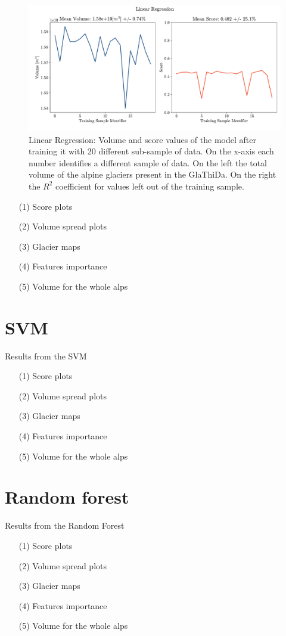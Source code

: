 \begin{figure}[!tp]
	\centering		  
	\includegraphics[width=1.\textwidth]{figures/LR_score.pdf}
	\caption{Linear Regression: Volume and score values of the model after training it with 20 different sub-sample of data. On the x-axis each number identifies a different sample of data. On the left the total volume of the alpine glaciers present in the GlaThiDa. On the right the $R^2$ coefficient for values left out of the training sample.}
	\label{fig:lr-score}
\end{figure}

\begin{itemize}
	\item[(1)] Score plots
	\item[(2)] Volume spread plots
	\item[(3)] Glacier maps
	\item[(4)] Features importance
	\item[(5)] Volume for the whole alps
\end{itemize}

\section{SVM}\label{svm}
Results from the SVM
\begin{itemize}
	\item[(1)] Score plots
	\item[(2)] Volume spread plots
	\item[(3)] Glacier maps
	\item[(4)] Features importance
	\item[(5)] Volume for the whole alps
\end{itemize}

\section{Random forest}\label{rfr}
Results from the Random Forest
\begin{itemize}
	\item[(1)] Score plots
	\item[(2)] Volume spread plots
	\item[(3)] Glacier maps
	\item[(4)] Features importance
	\item[(5)] Volume for the whole alps
\end{itemize}


